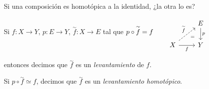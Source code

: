 \begin{tcolorbox}[colback=white!15!white,colframe=green!55!black,title=\textbf{Pregunta}]
        Si una composición es homotópica a la identidad, ¿la otra lo es?
\end{tcolorbox}

\begin{tcolorbox}[colback=blue-violet!5!white,colframe=blue-violet!75!black,title=\textbf{Definición}.\index{levantamiento}]

Si \(f\colon X\to Y\), \(p\colon E\to Y\), \(\overset{\sim}{f}\colon X\to E\) tal que 
\(p\circ \overset{\sim}{f}=f
\qquad
\begin{tikzcd}
    & E \arrow[d]{}{p} \\
    X \arrow[ur, dashed]{}{\overset{\sim}{f}}
    \arrow[r, swap]{}{f}
    \arrow[ur, draw=none, swap, xshift=1mm]{}{=}
    & Y
\end{tikzcd}\)



entonces decimos que \(\overset{\sim}{f}\) es un \textit{levantamiento} de \(f\).

\tcblower
    Si \(p\circ\overset{\sim}{f}\simeq f\), decimos que \(\overset{\sim}{f}\) es un \textit{levantamiento homotópico}.
\end{tcolorbox}


